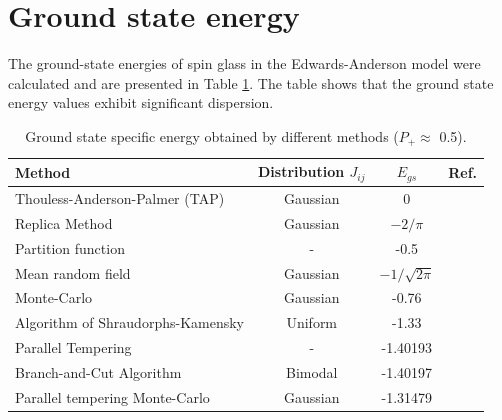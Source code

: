 \documentclass[preprint,12pt]{elsarticle}
\begin{document}
	\section{Ground state energy}
	
	The ground-state energies of spin glass in the Edwards-Anderson model were calculated and are presented in Table \ref{tab:Egs}. The table shows that the ground state energy values exhibit significant dispersion.
	
	\begin{table}[h]
		\begin{tabular}{|l|c|c|l|}
			\hline
			Method     &     Distribution $J_{ij}$                         &
			$E_{gs}$                                       &  Ref.                                          \\ \hline
			Thouless-Anderson-Palmer (TAP)& Gaussian &  0                                              & \cite{thouless1977solution}    \\ \hline
			Replica Method   & Gaussian                         & $-2/\pi$                                       & \cite{sherrington1975solvable} \\ \hline
			Partition function   &   -                 & -0.5                                           & \cite{tanaka1980analytic}      \\ \hline
			Mean random field  &   Gaussian  &                   $-1/\sqrt{2\pi}$                               & \cite{klein1976comparison}     \\ \hline
			Monte-Carlo      &   Gaussian    &        -0.76                                          & \cite{kirkpatrick1978infinite} \\ \hline
			Algorithm of Shraudorphs-Kamensky   &  Uniform &     -1.33                                          & \cite{karandashev2019global}   \\ \hline
			Parallel Tempering &   -       & -1.40193                                       & \cite{palmer1999ground}        \\ \hline
			Branch-and-Cut Algorithm  & Bimodal               & -1.40197                         
			& \cite{campbell2004energy}      \\ \hline
			
			Parallel tempering Monte-Carlo    &  Gaussian         & -1.31479                                       & \cite{roma2009ground}          \\ \hline
			
			
			
		\end{tabular}
		\caption{Ground state specific energy obtained by different methods ($P_+\approx$ 0.5).}
		\label{tab:Egs}
	\end{table}
	
\end{document}
